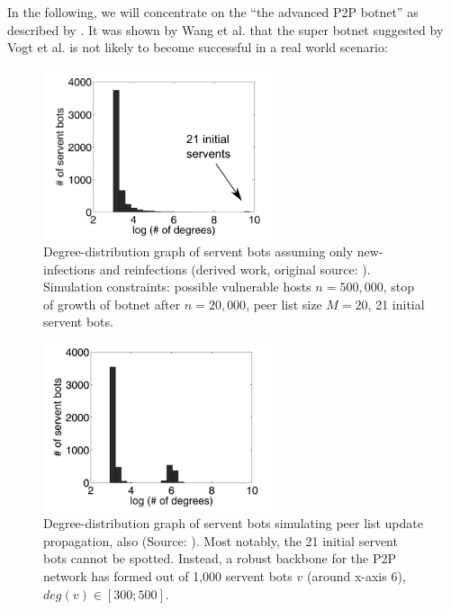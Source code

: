 \documentclass{llncs}
\begin{document}
In the following, we will concentrate on the ``the advanced P2P
botnet'' as described by \cite{td1sc}. It was shown by Wang et
al. \cite{td1sc} that the super botnet suggested by Vogt et al. is not
likely to become successful in a real world scenario:

\begin{figure}[htbp]
  \centering
  
    \includegraphics[width=0.6\textwidth]{figures/distributiongraph.png}
  
  \caption{Degree-distribution graph of servent bots assuming only new-infections and reinfections (derived work, original source: \cite{td1sc}). Simulation constraints: possible vulnerable hosts $n=500,000$, stop of growth of botnet after $n=20,000$, peer list size $M=20$, 21 initial servent bots.}
  \label{distributiongraph}
\end{figure}

\begin{figure}[htbp]
  \centering
  
    \includegraphics[width=0.6\textwidth]{figures/distributiongraph2.png}
  
  \caption{Degree-distribution graph of servent bots simulating peer list update propagation, also (Source: \cite{td1sc}). Most notably, the 21 initial servent bots cannot be spotted. Instead, a robust backbone for the P2P network has formed out of 1,000 servent bots $v$ (around x-axis 6), $deg(v) \in [300;500]$.}
  \label{distributiongraph2}
\end{figure}
\end{document}

